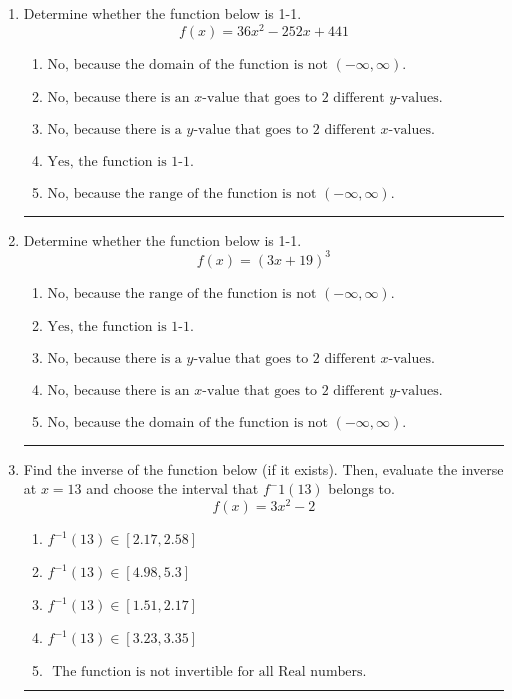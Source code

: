 \documentclass[14pt]{extbook}
\newcommand{\litem}[1]{\item#1\hspace*{-1cm}\rule{\textwidth}{0.4pt}}
\begin{document}
\begin{enumerate}
\litem{
Determine whether the function below is 1-1.\[ f(x) = 36 x^2 - 252 x + 441 \]\begin{enumerate}[label=\Alph*.]
\item \( \text{No, because the domain of the function is not $(-\infty, \infty)$.} \)
\item \( \text{No, because there is an $x$-value that goes to 2 different $y$-values.} \)
\item \( \text{No, because there is a $y$-value that goes to 2 different $x$-values.} \)
\item \( \text{Yes, the function is 1-1.} \)
\item \( \text{No, because the range of the function is not $(-\infty, \infty)$.} \)

\end{enumerate} }
\litem{
Determine whether the function below is 1-1.\[ f(x) = (3 x + 19)^3 \]\begin{enumerate}[label=\Alph*.]
\item \( \text{No, because the range of the function is not $(-\infty, \infty)$.} \)
\item \( \text{Yes, the function is 1-1.} \)
\item \( \text{No, because there is a $y$-value that goes to 2 different $x$-values.} \)
\item \( \text{No, because there is an $x$-value that goes to 2 different $y$-values.} \)
\item \( \text{No, because the domain of the function is not $(-\infty, \infty)$.} \)

\end{enumerate} }
\litem{
Find the inverse of the function below (if it exists). Then, evaluate the inverse at $x = 13$ and choose the interval that $f^-1(13)$ belongs to.\[ f(x) = 3 x^2 - 2 \]\begin{enumerate}[label=\Alph*.]
\item \( f^{-1}(13) \in [2.17, 2.58] \)
\item \( f^{-1}(13) \in [4.98, 5.3] \)
\item \( f^{-1}(13) \in [1.51, 2.17] \)
\item \( f^{-1}(13) \in [3.23, 3.35] \)
\item \( \text{ The function is not invertible for all Real numbers. } \)


\end{enumerate}}
\end{enumerate}
\end{document}
